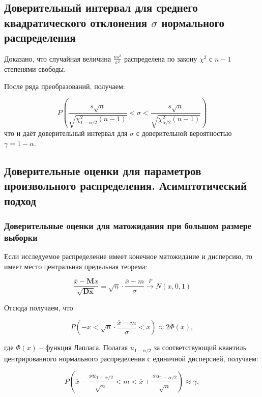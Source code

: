 \documentclass[12pt]{article}
\begin{document}
\subsection{Доверительный интервал для среднего квадратического отклонения $\sigma$ нормального распределения}

Доказано, что случайная величина $\frac{ns^2}{\sigma^2}$ распределена по закону $\chi^2$ с $n-1$ степенями свободы. 

После ряда преобразований, получаем:

\begin{equation}
	\displaystyle P \left( \frac{s \sqrt{n}} {\sqrt{\chi_{1 - \alpha/2}^2(n-1)}} < \sigma <  \frac{s \sqrt{n}} {\sqrt{\chi_{\alpha/2}^2(n-1)}} \right)
	\label{s_norm}
\end{equation}
\vskip 0.3cm
что и даёт доверительный интервал для $\sigma$ с доверительной вероятностью $\gamma = 1 - \alpha$. \cite{lit1}

\subsection{Доверительные оценки для параметров произвольного распределения. Асимптотический подход}

\subsubsection{Доверительные оценки для матожидания при большом размере выборки}

Если исследуемое распределение имеет конечное матожидание и дисперсию, то имеет место центральная предельная теорема:

\begin{equation}
\frac{\overline{x}-\mathbf{M}x}{\sqrt{\mathbf{Dx}}}=\sqrt{n} \cdot \frac{\overline{x} - m}{\sigma} \overset{F}{\longrightarrow} N(x, 0, 1)
\end{equation}

Отсюда получаем, что

\begin{equation*}
P \left(-x < \sqrt{n} \cdot \frac{\overline{x} - m}{\sigma} < x \right) \approx 2 \Phi(x),
\end{equation*}

где $\Phi(x)$ -- функция Лапласа.
\vskip 0.3cm
Полагая $u_{1 - \alpha / 2}$ за соответствующий квантиль центрированного нормального распределения с единичной дисперсией, получаем:

\begin{equation}\label{m_pr}
P \left(\overline{x} - \frac{su_{1 - \alpha / 2}}{\sqrt{n}} < m < \overline{x} + \frac{su_{1 - \alpha / 2}}{\sqrt{n}} \right) \approx \gamma,
\end{equation}
\end{document}
